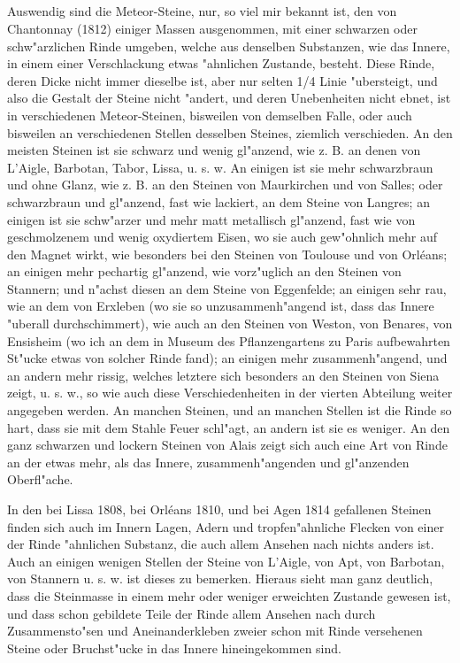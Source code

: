 \documentclass[a4paper, 11pt, oneside, polutonikogreek, german]{article}
\begin{document}
\subsection{}
\paragraph{}
Auswendig sind die Meteor-Steine, nur, so viel mir bekannt ist, den von Chantonnay (1812) einiger Massen ausgenommen, mit einer schwarzen oder schw"arzlichen Rinde umgeben, welche aus denselben Substanzen, wie das Innere, in einem einer Verschlackung etwas "ahnlichen Zustande, besteht. Diese Rinde, deren Dicke nicht immer dieselbe ist, aber nur selten 1/4 Linie "ubersteigt, und also die Gestalt der Steine nicht "andert, und deren Unebenheiten nicht ebnet, ist in verschiedenen Meteor-Steinen, bisweilen von demselben Falle, oder auch bisweilen an verschiedenen Stellen desselben Steines, ziemlich verschieden. An den meisten Steinen ist sie schwarz und wenig gl"anzend, wie z. B. an denen von L'Aigle, Barbotan, Tabor, Lissa, u. s. w. An einigen ist sie mehr schwarzbraun und ohne Glanz, wie z. B. an den Steinen von Maurkirchen und von Salles; oder schwarzbraun und gl"anzend, fast wie lackiert, an dem Steine von Langres; an einigen ist sie schw"arzer und mehr matt metallisch gl"anzend, fast wie von geschmolzenem und wenig oxydiertem Eisen, wo sie auch gew"ohnlich mehr auf den Magnet wirkt, wie besonders bei den Steinen von Toulouse und von Orléans; an einigen mehr pechartig gl"anzend, wie vorz"uglich an den Steinen von Stannern; und n"achst diesen an dem Steine von Eggenfelde; an einigen sehr rau, wie an dem von Erxleben (wo sie so unzusammenh"angend ist, dass das Innere "uberall durchschimmert), wie auch an den Steinen von Weston, von Benares, von Ensisheim (wo ich an dem in Museum des Pflanzengartens zu Paris aufbewahrten St"ucke etwas von solcher Rinde fand); an einigen mehr zusammenh"angend, und an andern mehr rissig, welches letztere sich besonders an den Steinen von Siena zeigt, u. s. w., so wie auch diese Verschiedenheiten in der vierten Abteilung weiter angegeben werden. An manchen Steinen, und an manchen Stellen ist die Rinde so hart, dass sie mit dem Stahle Feuer schl"agt, an andern ist sie es weniger. An den ganz schwarzen und lockern Steinen von Alais zeigt sich auch eine Art von Rinde an der etwas mehr, als das Innere, zusammenh"angenden und gl"anzenden Oberfl"ache.

In den bei Lissa 1808, bei Orléans 1810, und bei Agen 1814 gefallenen Steinen finden sich auch im Innern Lagen, Adern und tropfen"ahnliche Flecken von einer der Rinde "ahnlichen Substanz, die auch allem Ansehen nach nichts anders ist. Auch an einigen wenigen Stellen der Steine von L'Aigle, von Apt, von Barbotan, von Stannern u. s. w. ist dieses zu bemerken. Hieraus sieht man ganz deutlich, dass die Steinmasse in einem mehr oder weniger erweichten Zustande gewesen ist, und dass schon gebildete Teile der Rinde allem Ansehen nach durch Zusammensto"sen und Aneinanderkleben zweier schon mit Rinde versehenen Steine oder Bruchst"ucke in das Innere hineingekommen sind.
\end{document}
